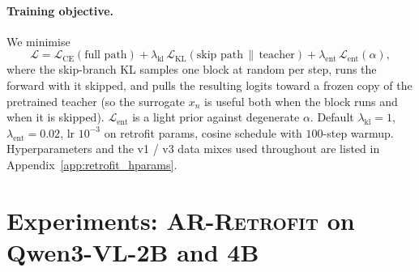 \documentclass{article}
\newcommand{\retrofit}{\textsc{AR-Retrofit}}
\begin{document}
\paragraph{Training objective.}
We minimise
\begin{equation}
  \mathcal{L} = \mathcal{L}_{\text{CE}}(\text{full path}) + \lambda_{\text{kl}}\,\mathcal{L}_{\text{KL}}(\text{skip path}\,\|\,\text{teacher}) + \lambda_{\text{ent}}\,\mathcal{L}_{\text{ent}}(\alpha) ,
  \label{eq:retrofit_loss}
\end{equation}
where the skip-branch KL samples one block at random per step, runs the forward with it skipped, and pulls the resulting logits toward a frozen copy of the pretrained teacher (so the surrogate $x_n$ is useful both when the block runs and when it is skipped). $\mathcal{L}_{\text{ent}}$ is a light prior against degenerate $\alpha$. Default $\lambda_{\text{kl}}{=}1$, $\lambda_{\text{ent}}{=}0.02$, lr $10^{-3}$ on retrofit params, cosine schedule with $100$-step warmup. Hyperparameters and the v1 / v3 data mixes used throughout are listed in Appendix~\ref{app:retrofit_hparams}.

\section{Experiments: \retrofit{} on Qwen3-VL-2B and 4B}
\label{sec:experiments}
\label{sec:exp_retrofit}
\end{document}
